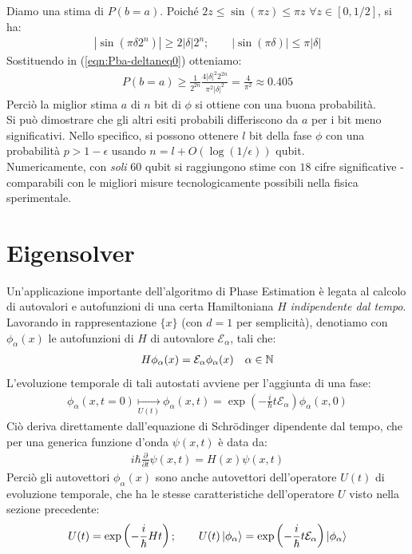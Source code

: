 \documentclass[../../InformazioneQuantistica.tex]{subfiles}
\begin{document}
\begin{enumerate}
    Diamo una stima di $P(b=a)$. Poiché $2z \leq \sin(\pi z) \leq \pi z$ $\forall z \in [0,1/2]$, si ha:
    \begin{align*}
        |\sin(\pi \delta 2^n)| \geq 2 |\delta| 2^n; \qquad |\sin(\pi \delta)| \leq \pi |\delta|
    \end{align*}
    Sostituendo in (\ref{eqn:Pba-deltaneq0}) otteniamo:
    \begin{align*}
        P(b=a) \geq \frac{1}{2^{2n}} \frac{4|\delta|^2 2^{2n}}{ \pi^2 |\delta|^2} = \frac{4}{\pi^2} \approx 0.405
    \end{align*}
    Perciò la miglior stima $a$ di $n$ bit di $\phi$ si ottiene con una buona probabilità.\\
    Si può dimostrare che gli altri esiti probabili differiscono da $a$ per i bit meno significativi. Nello specifico, si possono ottenere $l$ bit della fase $\phi$ con una probabilità $p>1-\epsilon$ usando $n=l+O(\log(1/\epsilon))$ qubit.\\
    Numericamente, con \textit{soli} $60$ qubit si raggiungono stime con $18$ cifre significative - comparabili con le migliori misure tecnologicamente possibili nella fisica sperimentale.
\end{enumerate}

\section{Eigensolver}
Un'applicazione importante dell'algoritmo di Phase Estimation è legata al calcolo di autovalori e autofunzioni di una certa Hamiltoniana $H$ \textit{indipendente dal tempo}.\\
Lavorando in rappresentazione $\{x\}$ (con $d=1$ per semplicità), denotiamo con $\phi_\alpha(x)$ le autofunzioni di $H$ di autovalore $\mathcal{E}_\alpha$, tali che:
\begin{align*}
    H\phi_\alpha(x) = \mathcal{E}_\alpha \phi_\alpha(x) \quad \alpha \in \mathbb{N}
\end{align*}
L'evoluzione temporale di tali autostati avviene per l'aggiunta di una fase:
\begin{align*}
    \phi_\alpha(x,t=0) \underset{U(t)}{\mapsto} \phi_\alpha(x,t) = \exp\left(-\frac{i}{\hbar} t \mathcal{E}_\alpha\right) \phi_\alpha(x,0)
\end{align*}
Ciò deriva direttamente dall'equazione di Schr\"odinger dipendente dal tempo, che per una generica funzione d'onda $\psi(x,t)$ è data da:
\begin{align*}
    i\hbar \frac{\partial}{\partial t} \psi(x,t) = H(x) \psi(x,t)
\end{align*}
Perciò gli autovettori $\phi_\alpha(x)$ sono anche autovettori dell'operatore $U(t)$ di evoluzione temporale, che ha le stesse caratteristiche dell'operatore $U$ visto nella sezione precedente:
\begin{align*}
    U(t) = \exp\left(-\frac{i}{\hbar} H t\right); \qquad U(t)\Ket{\phi_\alpha} = \exp\left(-\frac{i}{\hbar}t \mathcal{E}_\alpha\right) \Ket{\phi_\alpha}
\end{align*}
\end{document}
